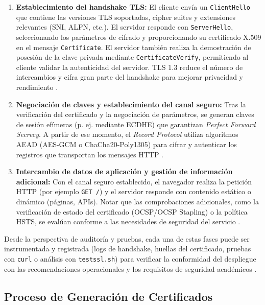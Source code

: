 \begin{enumerate}
    \item \textbf{Establecimiento del handshake TLS:} El cliente envía un \texttt{ClientHello} que contiene las versiones TLS soportadas, cipher suites y extensiones relevantes (SNI, ALPN, etc.). El servidor responde con \texttt{ServerHello}, seleccionando los parámetros de cifrado y proporcionando su certificado X.509 en el mensaje \texttt{Certificate}. El servidor también realiza la demostración de posesión de la clave privada mediante \texttt{CertificateVerify}, permitiendo al cliente validar la autenticidad del servidor. TLS 1.3 reduce el número de intercambios y cifra gran parte del handshake para mejorar privacidad y rendimiento \cite{rfc8446, bhargavan2014}.
    \item \textbf{Negociación de claves y establecimiento del canal seguro:} Tras la verificación del certificado y la negociación de parámetros, se generan claves de sesión efímeras (p. ej. mediante ECDHE) que garantizan \emph{Perfect Forward Secrecy}. A partir de ese momento, el \emph{Record Protocol} utiliza algoritmos AEAD (AES-GCM o ChaCha20-Poly1305) para cifrar y autenticar los registros que transportan los mensajes HTTP \cite{rfc7525}.
    \item \textbf{Intercambio de datos de aplicación y gestión de información adicional:} Con el canal seguro establecido, el navegador realiza la petición HTTP (por ejemplo \texttt{GET /}) y el servidor responde con contenido estático o dinámico (páginas, APIs). Notar que las comprobaciones adicionales, como la verificación de estado del certificado (OCSP/OCSP Stapling) o la política HSTS, se evalúan conforme a las necesidades de seguridad del servicio \cite{liu2015, helme2024}.
\end{enumerate}

Desde la perspectiva de auditoría y pruebas, cada una de estas fases puede ser instrumentada y registrada (logs de handshake, huellas del certificado, pruebas con \texttt{curl} o análisis con \texttt{testssl.sh}) para verificar la conformidad del despliegue con las recomendaciones operacionales y los requisitos de seguridad académicos \cite{rfc7525}.

\bigskip

\subsection{Proceso de Generación de Certificados}
\label{subsec:generacion_certificados}

